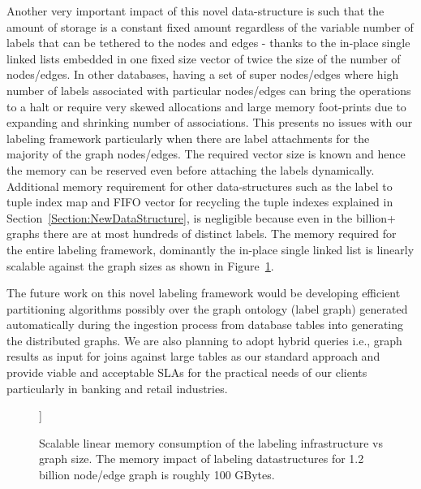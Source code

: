 \documentclass[preprint,3p,twocolumn]{elsarticle}
\begin{document}
Another very important impact of this novel data-structure is such that the amount of storage is a constant fixed amount regardless of the variable number of labels that can be tethered to the nodes and edges - thanks to the in-place single linked lists embedded in one fixed size vector of twice the size of the number of nodes/edges. In other databases, having a set of super nodes/edges where high number of labels associated with particular nodes/edges can bring the operations to a halt or require very skewed allocations and large memory foot-prints due to expanding and shrinking number of associations. This presents no issues with our labeling framework particularly when there are label attachments for the majority of the graph nodes/edges. The required vector size is known and hence the memory can be reserved even before attaching the labels dynamically. Additional memory requirement for other data-structures such as the label to tuple index map and FIFO vector for recycling the tuple indexes explained in Section~\ref{Section:NewDataStructure}, is negligible because even in the billion+ graphs there are at most hundreds of distinct labels. The memory required for the entire labeling framework,  dominantly the in-place single linked list is linearly scalable against the graph sizes as shown in Figure~\ref{Figure:memory}. 

The future work on this novel labeling framework would be developing efficient partitioning algorithms possibly over the graph ontology (label graph) generated automatically during the ingestion process from database tables into generating the distributed graphs. We are also planning to adopt hybrid queries i.e., graph results as input for joins against large tables as our standard approach and provide viable and acceptable SLAs for the practical needs of our clients particularly in banking and retail industries. 
 
\begin{figure}
\centering
\begin{bchart}[step=1,max=4,scale=0.7]]
\end{bchart}
 \caption{Scalable linear memory consumption of the labeling infrastructure vs graph size. The memory impact of labeling datastructures for 1.2 billion node/edge graph is roughly 100 GBytes.}
    \label{Figure:memory}
\end{figure}
\end{document}
